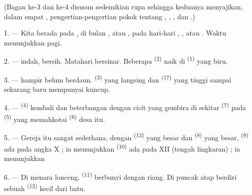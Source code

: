 \VUsaut{3.0mm}
\VUsaut{1.6mm}
\VUsaut{3.4mm}

(Bagan ke-3 dan ke-4 disusun sedemikian rupa sehingga keduanya
menyajikan, dalam empat , pengertian-pengertian
pokok tentang , , ,
 dan .)

\VUsaut{4.0mm}
\VUsaut{3.0mm}

\VUsaut{2.4mm}

\VUsaut{3.0mm}

1. --- Kita berada pada , di bulan ,
 atau , pada hari-hari ,
,  atau . Waktu menunjukkan
 pagi.

2. ---  indah,  bersih. Matahari
bersinar. Beberapa  \textsuperscript{(2)} naik di
 \textsuperscript{(1)} yang biru.

3. ---  hampir belum berdaun.  \textsuperscript{(3)} yang langsing dan 
\textsuperscript{(17)} yang tinggi sampai sekarang baru mempunyai
kuncup.

4. ---  \textsuperscript{(4)}
kembali dan beterbangan dengan cicit yang gembira di sekitar
 \textsuperscript{(7)} pada  \textsuperscript{(5)} yang memahkotai 
\textsuperscript{(6)} desa itu.

\VUsaut{3.4mm}
\VUsaut{3.0mm}

5. --- Gereja itu sangat sederhana, dengan 
\textsuperscript{(13)} yang besar dan 
\textsuperscript{(8)} yang besar. 
\textsuperscript{(9)} ada pada angka X ; ia menunjukkan 
 \textsuperscript{(10)} ada pada XII (tengah
lingkaran) ; ia menunjukkan 

6. --- Di menara lonceng, 
\textsuperscript{(11)} berbunyi dengan riang. Di puncak atap berdiri
sebuah  \textsuperscript{(12)} kecil dari batu.

